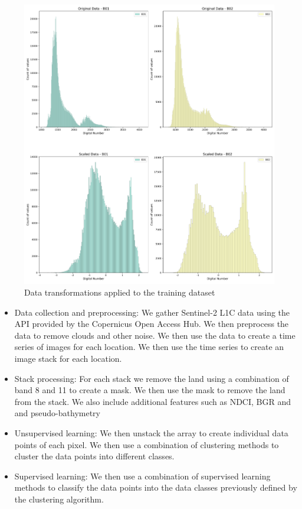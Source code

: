 \documentclass[journal,article,submit,pdftex,moreauthors]{Definitions/mdpi}
\begin{document}
\begin{figure}
	\includegraphics[width=\linewidth]{Images/Scaling_Training_Data.png}
	\caption{Data transformations applied to the training dataset}
	\label{fig:Scaling}
\end{figure}

\begin{itemize}
	\item Data collection and preprocessing: We gather Sentinel-2 L1C data using the API provided by the Copernicus Open Access Hub. We then preprocess the data to remove clouds and other noise. We then use the data to create a time series of images for each location. We then use the 
	time series to create an image stack for each location.
	\item Stack processing: For each stack we remove the land using a combination of band 8 and 11 to create a mask. We then use the mask to remove the land from the stack. We also include additional features such as NDCI, BGR and and pseudo-bathymetry
	\item Unsupervised learning: We then unstack the array to create individual data points of each pixel. We then use a combination of clustering methods to cluster the data points into different classes. 
	\item Supervised learning: We then use a combination of supervised learning methods to classify the data points into the data classes previously defined by the clustering algorithm.
\end{itemize}
\end{document}
